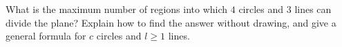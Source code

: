 What is the maximum number of regions into which $4$ circles and $3$ lines can divide the plane? Explain how to find the answer without drawing, and give a general formula for $c$ circles and $l\ge1$ lines.
